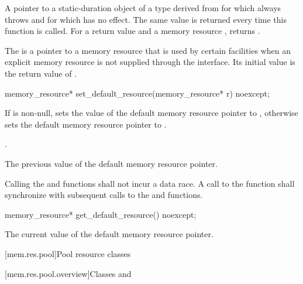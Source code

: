 \begin{itemdescr}
\pnum
\returns
A pointer to a static-duration object of a type derived from 
for which  always throws  and
for which  has no effect.
The same value is returned every time this function is called.
For a return value  and a memory resource ,
 returns .
\end{itemdescr}

\pnum
The  is a pointer to a memory resource
that is used by certain facilities when an explicit memory resource
is not supplied through the interface.
Its initial value is the return value of .

%
\begin{itemdecl}
memory_resource* set_default_resource(memory_resource* r) noexcept;
\end{itemdecl}

\begin{itemdescr}
\pnum
\effects
If  is non-null,
sets the value of the default memory resource pointer to ,
otherwise sets the default memory resource pointer to .

\pnum
\postconditions
{}.

\pnum
\returns
The previous value of the default memory resource pointer.

\pnum
\remarks
Calling the  and
 functions shall not incur a data race.
A call to the  function
shall synchronize with subsequent calls to
the  and  functions.
\end{itemdescr}

%
\begin{itemdecl}
memory_resource* get_default_resource() noexcept;
\end{itemdecl}

\begin{itemdescr}
\pnum
\returns
The current value of the default memory resource pointer.
\end{itemdescr}

[mem.res.pool]{Pool resource classes}

[mem.res.pool.overview]{Classes  and }

